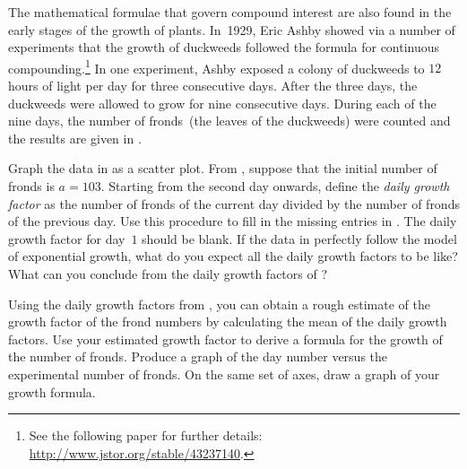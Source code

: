 \documentclass[a4paper,oneside,12pt]{article}
\begin{document}
\begin{problem}
\item\label{prob:duckweeds}
  The mathematical formulae that govern compound interest are also
  found in the early stages of the growth of plants.  In~1929, Eric
  Ashby showed via a number of experiments that the growth of
  duckweeds followed the formula for continuous compounding.\footnote{
    See the following paper for further details:
    \url{http://www.jstor.org/stable/43237140}.
  }
  In one experiment, Ashby exposed a colony of duckweeds to $12$ hours
  of light per day for three consecutive days.  After the three days,
  the duckweeds were allowed to grow for nine consecutive days.
  During each of the nine days, the number of fronds~(the leaves of
  the duckweeds) were counted and the results are given in
  .
  \begin{packedenum}
  \item\label{subprob:duckweeds_growth_factor}
    Graph the data in  as a
    scatter plot.  From , suppose
    that the initial number of fronds is $a = 103$.  Starting from the
    second day onwards, define the \emph{daily growth factor} as the
    number of fronds of the current day divided by the number of
    fronds of the previous day.  Use this procedure to fill in the
    missing entries in .  The
    daily growth factor for day~$1$ should be blank.  If the data in
     perfectly follow the model of
    exponential growth, what do you expect all the daily growth
    factors to be like?  What can you conclude from the daily growth
    factors of ?

  \item\label{subprob:duckweeds_growth_factor_estimate}
    Using the daily growth factors
    from , you can obtain a
    rough estimate of the growth factor of the frond numbers by
    calculating the mean of the daily growth factors.  Use your
    estimated growth factor to derive a formula for the growth of the
    number of fronds.  Produce a graph of the day number versus the
    experimental number of fronds.  On the same set of axes, draw a
    graph of your growth formula.


\end{packedenum}
\end{problem}
\end{document}
